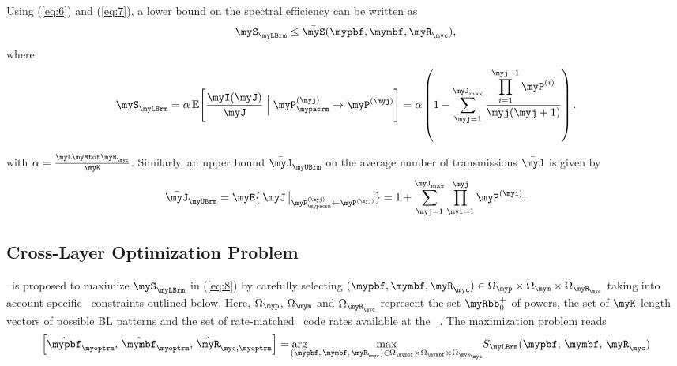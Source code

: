 \begin{minipage}[t][12cm]{\columnwidth}
\noindent
Using (\ref{eq:6}) and (\ref{eq:7}), a lower bound on the spectral efficiency can be written as
\[
\myS_{\myLBrm} \le \bar{\myS}(\mypbf,\mymbf,\myR_\myc),
\]
where
\begin{equation}
\myS_{\myLBrm} 
= \alpha \, \mathbb{E} \Biggl[
    \frac{\myI(\myJ)}{\myJ} \;\Big|\; \myP_{\mypacrm}^{(\myj)} \to \myP^{(\myj)}
\Biggr]
= \alpha \left(
    1 - \sum_{\myj=1}^{\myJ_{\max}} 
        \frac{\displaystyle \prod_{i=1}^{\myj-1} \myP^{(i)}}{\myj (\myj+1)}
\right).
\label{eq:8}
\end{equation}

with $\alpha = \frac{\myL \myMtot \myR_{\myc}}{\myK}$. 
Similarly, an upper bound $\bar{\myJ}_{\myUBrm}$ on the
average number of transmissions $\bar{\myJ}$ is given by
\begin{equation*}
    \bar{\myJ}_{\myUBrm}
    = \myE {\, \myJ \,\big|_{\myP_{\mypacrm}^{(\myj)} \leftarrow \myP^{(\myj)}} }
    = 1 + \sum_{\myj=1}^{\myJ_{\max}} \prod_{\myi=1}^{\myj} \myP^{(\myi)} .
\end{equation*}

\end{minipage}

\clearpage

\subsection{Cross-Layer Optimization Problem}
\label{sec:3c}
\myCLO\ is proposed to maximize $\myS_{\myLBrm}$ in (\ref{eq:8}) by carefully selecting
$(\mypbf, \mymbf, \myR_{\myc}) \in \Omega_{\myp} \times \Omega_{\mym} \times \Omega_{\myR_{\myc}}$
taking into account specific \myQoS\ constraints outlined below. Here, $\Omega_{\myp}$,
$\Omega_{\mym}$ and $\Omega_{\myR_{\myc}}$ represent the set $\myRbb^{+}_{0}$ of powers,
the set of $\myK$-length vectors of possible BL patterns \cite{Mansour2018_alt} and the set of
rate-matched \myLDPC\ code rates available at the \mySU\ \myTX{}. The maximization problem reads
\begin{equation*}
\left[ \hat{\mypbf}_{\myoptrm},\,
       \hat{\mymbf}_{\myoptrm},\,
       \hat{\myR}_{\myc,\myoptrm}
\right]
=\arg\hspace{-4ex}\max\limits_{(\mypbf,\,\mymbf,\,\myR_\myc)\in\Omega_{\mypbf}\times\Omega_{\mymbf}\times\Omega_{\myR_\myc}}
\hspace{-0.5ex}S_{\myLBrm}(\mypbf,\,\mymbf,\,\myR_\myc)
\end{equation*}

